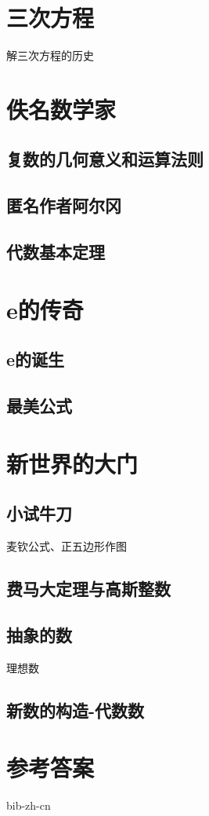 \documentclass[b5paper]{ctexart}
\begin{document}
\section{三次方程}
解三次方程的历史

\section{佚名数学家}
\subsection{复数的几何意义和运算法则}
\subsection{匿名作者阿尔冈}
\subsection{代数基本定理}

\section{e的传奇}
\subsection{e的诞生}
\subsection{最美公式}

\section{新世界的大门}
\subsection{小试牛刀}
麦钦公式、正五边形作图
\subsection{费马大定理与高斯整数}
\subsection{抽象的数}
理想数
\subsection{新数的构造-代数数}

\ifx\wholebook\relax \else
\section{参考答案}
\shipoutAnswer

\begin{thebibliography}{99}
{bib-zh-cn}
\end{thebibliography}

\expandafter\enddocument
\fi
\end{document}
